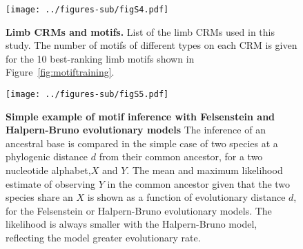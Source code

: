 \documentclass[10pt]{article}
\begin{document}
\begin{figure}[!htbp]
\begin{center}
\texttt{[image: ../figures-sub/figS4.pdf]}
\end{center}
\caption{{ \bf Limb CRMs and motifs.}
List of the limb CRMs used in this study. The number of motifs of different
types on each CRM is given for the 10 best-ranking limb motifs shown in
Figure~\ref{fig:motiftraining}.}
\label{fig:lcrm}
\end{figure}

\begin{figure}[!htbp]
\begin{center}
   \texttt{[image: ../figures-sub/figS5.pdf]}
\end{center}
\caption{ 
{\bf  Simple example of motif inference with  Felsenstein and 
  Halpern-Bruno evolutionary models}  
    The inference of an ancestral base is compared in
    the simple case of two species at a phylogenic distance $d$
    from their common ancestor, for a two nucleotide alphabet,$X$ and $Y$.  
    The mean and maximum likelihood estimate of observing $Y$ in the 
    common ancestor given that the two species share an $X$ is shown as
    a function of evolutionary distance $d$, for the Felsenstein or 
    Halpern-Bruno evolutionary models.
    The likelihood is always smaller with the Halpern-Bruno model, reflecting
the model greater evolutionary rate.}
     \label{fig:evol}
    \end{figure} 



\end{document}
